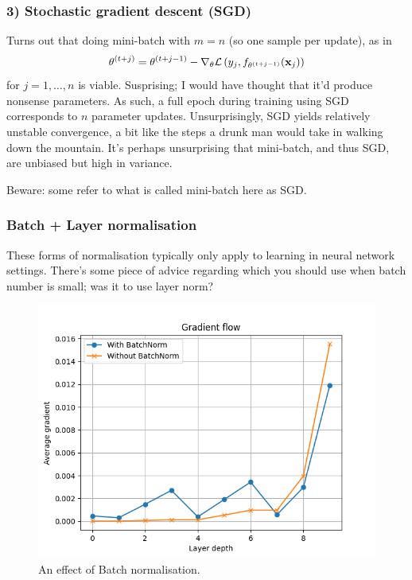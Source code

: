 \documentclass[11pt]{article}
\begin{document}
\subsubsection*{3) Stochastic gradient descent (SGD)}
Turns out that doing mini-batch with $m=n$ (so one sample per update), as in
$$
\theta^{(t+j)}
=
\theta^{(t+j-1)}-\nabla_{\theta}\mathcal{L}\left(y_j,f_{\theta^{(t+j-1)}}(\mathbf{x}_j)\right)
$$
for $j=1,\dots,n$ is viable. Susprising; I would have thought that it'd produce nonsense parameters. As such, a full epoch during training using SGD corresponds to $n$ parameter updates. Unsurprisingly, SGD yields relatively unstable convergence, a bit like the steps a drunk man would take in walking down the mountain. It's perhaps unsurprising that mini-batch, and thus SGD, are unbiased but high in variance.

\begin{tcolorbox}[title={\centering\textbf{Confusing use of terminology}}, colback=myLightBlue, colbacktitle=myDarkBlue, colframe=myDarkBlue, coltitle=white]
    Beware: some refer to what is called mini-batch here as SGD.
\end{tcolorbox}

\subsubsection{Batch + Layer normalisation}
These forms of normalisation typically only apply to learning in neural network settings. There's some piece of advice regarding which you should use when batch number is small; was it to use layer norm?

\begin{figure}[t]
    \centering
    \includegraphics[width=\columnwidth]{./figures/gradient_descent/batch_norm.png}
    \caption{An effect of Batch normalisation. }
    \label{fig:batch_norm}
\end{figure}
\end{document}
